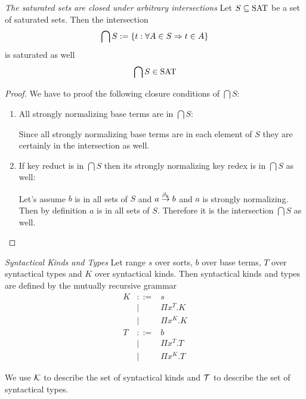 \begin{theorem}
    \emph{The saturated sets are closed under arbitrary intersections}
    Let $S \subseteq \text{SAT}$ be a set of saturated sets. Then the intersection
    $$
    \bigcap S := {\{t: \forall A \in S \Rightarrow t \in A\}}
    $$
    is saturated as well
    $$
    \bigcap S \in \text{SAT}
    $$
    \begin{proof}
        We have to proof the following closure conditions of $\bigcap S$:

        \begin{enumerate}
        \item All strongly normalizing base terms are in $\bigcap S$:

            Since all strongly normalizing base terms are in each element of $S$
                they are certainly in the intersection as well.

        \item If key reduct is in $\bigcap S$ then its strongly normalizing key
            redex is in $\bigcap S$ as well:


            Let's assume $b$ is in all sets of $S$ and $a \stackrel{\beta_{\text{k}}}{\to} b$ and $a$
                is strongly normalizing. Then by definition $a$ is in all sets
                of $S$. Therefore it is the intersection $\bigcap S$ as well.
        \end{enumerate}
    \end{proof}
\end{theorem}


\begin{definition} \emph{Syntactical Kinds and Types} Let range $s$ over sorts,
    $b$ over base terms, $T$ over syntactical types and $K$ over syntactical
    kinds. Then syntactical kinds and types are defined by the mutually
    recursive grammar
    $$
    \begin{array}{lll}
        K &::=& s
        \\
        &\mid& \Pi x^T. K
        \\
        &\mid& \Pi x^K. K
        \\
        T &::=& b
        \\
        &\mid& \Pi x^T. T
        \\
        &\mid& \Pi x^K. T
    \end{array}
    $$

    We use ${\cal K}$ to describe the set of syntactical kinds and ${\cal T}$ to
    describe the set of syntactical types.
\end{definition}



